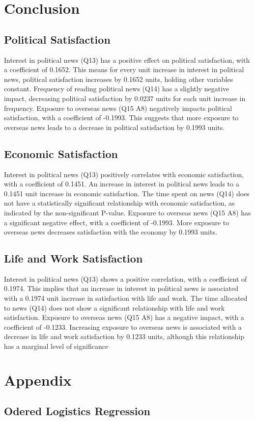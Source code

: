 \documentclass{article}
\begin{document}
\section{Conclusion}
\subsection{Political Satisfaction}
Interest in political news (Q13) has a positive effect on political satisfaction, with a coefficient of 0.1652. This means for every unit increase in interest in political news, political satisfaction increases by 0.1652 units, holding other variables constant.
Frequency of reading political news (Q14) has a slightly negative impact, decreasing political satisfaction by 0.0237 units for each unit increase in frequency.
Exposure to overseas news (Q15 A8) negatively impacts political satisfaction, with a coefficient of -0.1993. This suggests that more exposure to overseas news leads to a decrease in political satisfaction by 0.1993 units.
\subsection{Economic Satisfaction}
Interest in political news (Q13) positively correlates with economic satisfaction, with a coefficient of 0.1451. An increase in interest in political news leads to a 0.1451 unit increase in economic satisfaction.
The time spent on news (Q14) does not have a statistically significant relationship with economic satisfaction, as indicated by the non-significant P-value.
Exposure to overseas news (Q15 A8) has a significant negative effect, with a coefficient of -0.1993. More exposure to overseas news decreases satisfaction with the economy by 0.1993 units.
\subsection{Life and Work Satisfaction}
Interest in political news (Q13) shows a positive correlation, with a coefficient of 0.1974. This implies that an increase in interest in political news is associated with a 0.1974 unit increase in satisfaction with life and work.
The time allocated to news (Q14) does not show a significant relationship with life and work satisfaction.
Exposure to overseas news (Q15 A8) has a negative impact, with a coefficient of -0.1233. Increasing exposure to overseas news is associated with a decrease in life and work satisfaction by 0.1233 units, although this relationship has a marginal level of significance

\newpage
\section{Appendix}
\subsection{Odered Logistics Regression}

\end{document}
